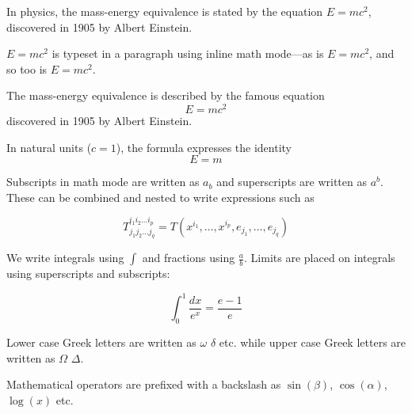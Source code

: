 \documentclass{article}
\begin{document}
In physics, the mass-energy equivalence is stated 
by the equation $E=mc^2$, discovered in 1905 by Albert Einstein.

\begin{math}
    E=mc^2
\end{math} is typeset in a paragraph using inline math mode---as is $E=mc^2$, and so too is \(E=mc^2\).

The mass-energy equivalence is described by the famous equation
\[ E=mc^2 \] discovered in 1905 by Albert Einstein. 

In natural units ($c = 1$), the formula expresses the identity
\begin{equation}
E=m
\end{equation}

Subscripts in math mode are written as $a_b$ and superscripts are written as $a^b$.
These can be combined and nested to write expressions such as

\[ T^{i_1 i_2 \dots i_p}_{j_1 j_2 \dots j_q} = T(x^{i_1},\dots,x^{i_p},e_{j_1},\dots,e_{j_q}) \]

We write integrals using $\int$ and fractions using $\frac{a}{b}$.
Limits are placed on integrals using superscripts and subscripts:

\[ \int_0^1 \frac{dx}{e^x} =  \frac{e-1}{e} \]

Lower case Greek letters are written as $\omega$ $\delta$ etc.
while upper case Greek letters are written as $\Omega$ $\Delta$.

Mathematical operators are prefixed with a backslash as $\sin(\beta)$, $\cos(\alpha)$, $\log(x)$ etc.
\end{document}
